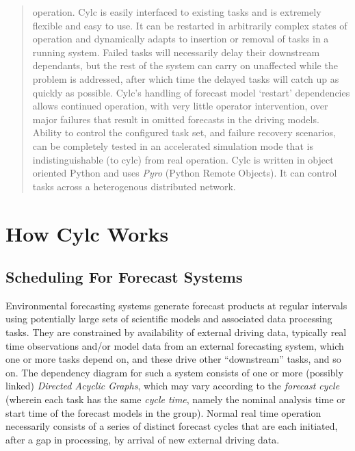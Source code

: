 \documentclass[11pt,a4paper]{article}
\begin{document}
\begin{abstract}
    operation. Cylc is easily interfaced to existing tasks and is
    extremely flexible and easy to use. It can be restarted in
    arbitrarily complex states of operation and dynamically adapts to
    insertion or removal of tasks in a running system.  Failed tasks
    will necessarily delay their downstream dependants, but the rest of
    the system can carry on unaffected while the problem is addressed,
    after which time the delayed tasks will catch up as quickly as
    possible.  Cylc's handling of forecast model `restart' dependencies
    allows continued operation, with very little operator intervention,
    over major failures that result in omitted forecasts in the driving
    models.  Ability to control the configured task set, and failure
    recovery scenarios, can be completely tested in an accelerated
    simulation mode that is indistinguishable (to cylc) from real
    operation.  Cylc is written in object oriented Python and uses {\em
    Pyro} (Python Remote Objects). It can control tasks across a
    heterogenous distributed network.  

\end{abstract}

\pagebreak
\section{How Cylc Works}
\label{sec:FS}

\subsection{Scheduling For Forecast Systems}

Environmental forecasting systems generate forecast products at regular
intervals using potentially large sets of scientific models and
associated data processing tasks. They are constrained by availability
of external driving data, typically real time observations and/or model
data from an external forecasting system, which one or more tasks depend
on, and these drive other ``downstream'' tasks, and so on. The
dependency diagram for such a system consists of one or more (possibly
linked) {\em Directed Acyclic Graphs}, which may vary according to the
{\em forecast cycle} (wherein each task has the same {\em cycle time},
namely the nominal analysis time or start time of the forecast models in
the group). Normal real time operation necessarily consists of a series
of distinct forecast cycles that are each initiated, after a gap in
processing, by arrival of new external driving data.
\end{document}
